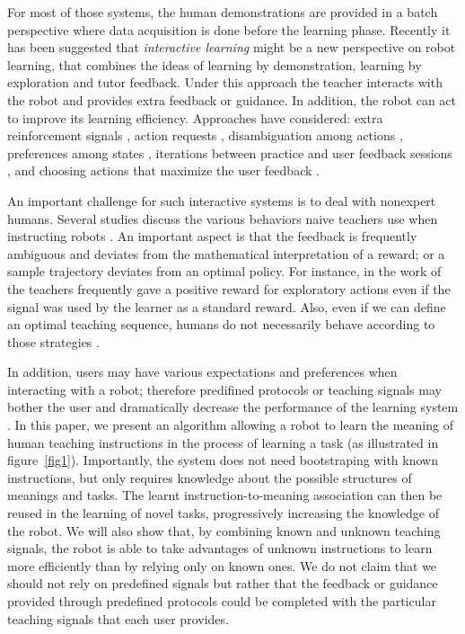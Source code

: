 For most of those systems, the human demonstrations are provided in a batch perspective where data acquisition is done before the learning phase. Recently it has been suggested that \textit{interactive learning} \cite{nicolescu2003natural}\cite{Breazeal2004} might be a new perspective on robot learning, that combines the ideas of learning by demonstration, learning by exploration and tutor feedback. Under this approach the teacher interacts with the robot and provides extra feedback or guidance. In addition, the robot can act to improve its learning efficiency. Approaches have considered: extra reinforcement signals \cite{Thomaz2008}, action requests \cite{macl09airl}, disambiguation among actions \cite{chernova09jair}, preferences among states \cite{Mason2011}, iterations between practice and user feedback sessions \cite{judah2010rlandcritique}, and choosing actions that maximize the user feedback \cite{knox2009interactively}. %

An important challenge for such interactive systems is to deal with nonexpert humans. Several studies discuss the various behaviors naive teachers use when instructing robots \cite{Thomaz2008,Cakmak2010}. An important aspect is that the feedback is frequently ambiguous and deviates from the mathematical interpretation of a reward; or a sample trajectory deviates from an optimal policy. For instance, in the work of \cite{Thomaz2008} the teachers frequently gave a positive reward for exploratory actions even if the signal was used by the learner as a standard reward. Also, even if we can define an optimal teaching sequence, humans do not necessarily behave according to those strategies \cite{Cakmak2010}.

In addition, users may have various expectations and preferences when interacting with a robot; therefore predifined protocols or teaching signals may bother the user and dramatically decrease the performance of the learning system \cite{rouanet2013impact}. In this paper, we present an algorithm allowing a robot to learn the meaning of human teaching instructions in the process of learning a task (as illustrated in figure~\ref{fig1}). Importantly, the system does not need bootstraping with known instructions, but only requires knowledge about the possible structures of meanings and tasks. The learnt instruction-to-meaning association can then be reused in the learning of novel tasks, progressively increasing the knowledge of the robot. We will also show that, by combining known and unknown teaching signals, the robot is able to take advantages of unknown instructions to learn more efficiently than by relying only on known ones. We do not claim that we should not rely on predefined signals but rather that the feedback or guidance provided through predefined protocols could be completed with the particular teaching signals that each user provides.

